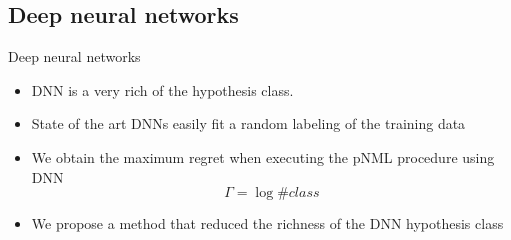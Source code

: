 \documentclass[aspectratio=169]{beamer}
\newcommand{\SubItem}[1]{
    {\setlength\itemindent{15pt} \item[-] #1}
}
\begin{document}

\subsection{Deep neural networks}
\begin{frame}{Deep neural networks}
\begin{itemize}
\setlength\itemsep{2em}
\item DNN is a very rich of the hypothesis class. 
\item State of the art DNNs easily fit a random labeling of the training data~
\item We obtain the maximum regret when executing the pNML procedure using DNN
    \begin{equation}
    \Gamma = \log \# \textit{class}
    \end{equation}
\item We propose a method that reduced the richness of the DNN hypothesis class
\end{itemize}
\end{frame}
\end{document}
